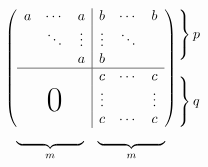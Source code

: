 \documentclass[12pt]{ctexbook}  %
\begin{document}
	\[
	\begin{array}{c@{\hspace{-5pt}}l}
		\left(
		\begin{array}{ccc|ccc}
		a & \cdots & a & b & \cdots & b\\
		& \ddots & \vdots & \vdots &  \ddots  \\
		&        & a & b \\  \hline
		&        &   & c & \cdots & c\\
		&        &   & \vdots & & \vdots\\
		\multicolumn{3}{c |}{\raisebox{2ex}[0pt]{\Huge 0}}
		& c & \cdots & c
		\end{array}
		\right)
		&
		\begin{array}{l}
		\left.\rule{0mm}{7mm}\right\}p\\
		\\
		\left.\rule{0mm}{7mm}\right\}q
		\end{array}
		\\[5pt]
		\begin{array}{cc}
			\underbrace{\rule{17mm}{0mm}}_m &
			\underbrace{\rule{17mm}{0mm}}_m 
		\end{array}
		&
	\end{array}
	\]
\end{document}
